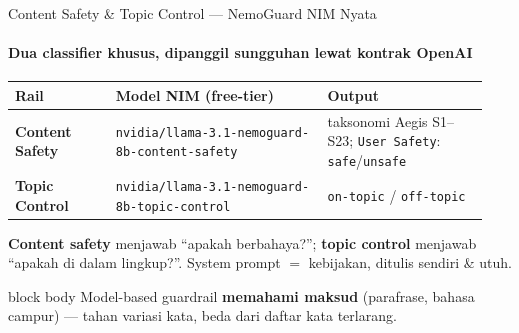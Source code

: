 \documentclass[aspectratio=169,t]{beamer}
\newcommand{\takeaway}[1]{%
  \vspace{0.3em}
  \begin{beamercolorbox}[rounded=true,shadow=false,sep=6pt]{block body}
    \centering\small\color{nvlightgreen}#1
  \end{beamercolorbox}%
}
\begin{document}
\begin{frame}{Content Safety \& Topic Control --- NemoGuard NIM Nyata}
  \framesubtitle{Dua classifier khusus, dipanggil sungguhan lewat kontrak OpenAI}
  \begin{center}
  \renewcommand{\arraystretch}{1.22}{\footnotesize\setlength{\tabcolsep}{5pt}
  \begin{tabular}{@{}>{\raggedright\arraybackslash}p{0.20\linewidth}>{\raggedright\arraybackslash\scriptsize}p{0.42\linewidth}>{\raggedright\arraybackslash}p{0.32\linewidth}@{}}
    \toprule \rowcolor{nvcard!50}
    \textbf{Rail} & {\footnotesize\textbf{Model NIM (free-tier)}} & \textbf{Output} \\ \midrule
    \textbf{Content Safety} & \texttt{nvidia/\allowbreak llama-3.1-\allowbreak nemoguard-\allowbreak 8b-\allowbreak content-\allowbreak safety} & taksonomi Aegis S1--S23; \texttt{User Safety}: \texttt{safe}/\texttt{unsafe} \\
    \textbf{Topic Control} & \texttt{nvidia/\allowbreak llama-3.1-\allowbreak nemoguard-\allowbreak 8b-\allowbreak topic-\allowbreak control} & \texttt{on-topic} / \texttt{off-topic} \\
    \bottomrule
  \end{tabular}}
  \end{center}
  \vspace{0.2em}
  \begin{center}\textcolor{nvgray}{\scriptsize \textbf{Content safety} menjawab ``apakah berbahaya?''; \textbf{topic control} menjawab ``apakah di dalam lingkup?''. System prompt $=$ kebijakan, ditulis sendiri \& utuh.}\end{center}
  \takeaway{Model-based guardrail \textbf{memahami maksud} (parafrase, bahasa campur) --- tahan variasi kata, beda dari daftar kata terlarang.}
\end{frame}
\end{document}
